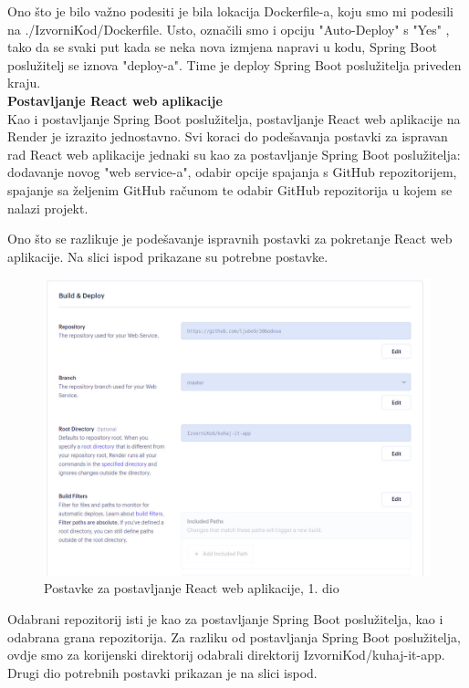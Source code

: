 		Ono što je bilo važno podesiti je bila lokacija Dockerfile-a, koju smo mi podesili na ./IzvorniKod/Dockerfile. Usto, označili smo i opciju "Auto-Deploy" s "Yes" , tako da se svaki put kada se neka nova izmjena napravi u kodu, Spring Boot poslužitelj se iznova "deploy-a". Time je deploy Spring Boot poslužitelja priveden kraju. \\
		
	\textbf{Postavljanje React web aplikacije} \\
	Kao i postavljanje Spring Boot poslužitelja, postavljanje React web aplikacije na Render je izrazito jednostavno. Svi koraci do podešavanja postavki za ispravan rad React web aplikacije jednaki su kao za postavljanje Spring Boot poslužitelja: dodavanje novog "web service-a", odabir opcije spajanja s GitHub repozitorijem, spajanje sa željenim GitHub računom te odabir GitHub repozitorija u kojem se nalazi projekt.
	
	Ono što se razlikuje je podešavanje ispravnih postavki za pokretanje React web aplikacije. Na slici ispod prikazane su potrebne postavke.
	
		\begin{figure}[H]
			\includegraphics[scale=0.4]{slike/Render_FRONTEND_1.JPG} %
			\centering
			\caption{Postavke za postavljanje React web aplikacije, 1. dio}
			\label{Postavke za postavljanje React web aplikacije, 1. dio}
		\end{figure}
		
	Odabrani repozitorij isti je kao za postavljanje Spring Boot poslužitelja, kao i odabrana grana repozitorija.
	Za razliku od postavljanja Spring Boot poslužitelja, ovdje smo za korijenski direktorij odabrali direktorij IzvorniKod/kuhaj-it-app. Drugi dio potrebnih postavki prikazan je na slici ispod.
	
